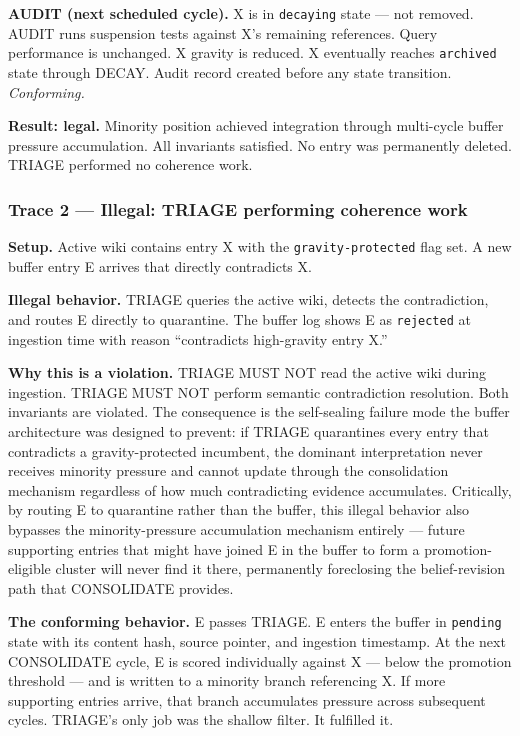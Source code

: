 \documentclass[
  11pt,
]{article}
\begin{document}
\textbf{AUDIT (next scheduled cycle).} X is in \texttt{decaying} state
--- not removed. AUDIT runs suspension tests against X's remaining
references. Query performance is unchanged. X gravity is reduced. X
eventually reaches \texttt{archived} state through DECAY. Audit record
created before any state transition. \emph{Conforming.}

\textbf{Result: legal.} Minority position achieved integration through
multi-cycle buffer pressure accumulation. All invariants satisfied. No
entry was permanently deleted. TRIAGE performed no coherence work.

\hypertarget{trace-2-illegal-triage-performing-coherence-work}{%
\subsubsection{Trace 2 --- Illegal: TRIAGE performing coherence
work}\label{trace-2-illegal-triage-performing-coherence-work}}

\textbf{Setup.} Active wiki contains entry X with the
\texttt{gravity-protected} flag set. A new buffer entry E arrives that
directly contradicts X.

\textbf{Illegal behavior.} TRIAGE queries the active wiki, detects the
contradiction, and routes E directly to quarantine. The buffer log shows
E as \texttt{rejected} at ingestion time with reason ``contradicts
high-gravity entry X.''

\textbf{Why this is a violation.} TRIAGE MUST NOT read the active wiki
during ingestion. TRIAGE MUST NOT perform semantic contradiction
resolution. Both invariants are violated. The consequence is the
self-sealing failure mode the buffer architecture was designed to
prevent: if TRIAGE quarantines every entry that contradicts a
gravity-protected incumbent, the dominant interpretation never receives
minority pressure and cannot update through the consolidation mechanism
regardless of how much contradicting evidence accumulates. Critically,
by routing E to quarantine rather than the buffer, this illegal behavior
also bypasses the minority-pressure accumulation mechanism entirely ---
future supporting entries that might have joined E in the buffer to form
a promotion-eligible cluster will never find it there, permanently
foreclosing the belief-revision path that CONSOLIDATE provides.

\textbf{The conforming behavior.} E passes TRIAGE. E enters the buffer
in \texttt{pending} state with its content hash, source pointer, and
ingestion timestamp. At the next CONSOLIDATE cycle, E is scored
individually against X --- below the promotion threshold --- and is
written to a minority branch referencing X. If more supporting entries
arrive, that branch accumulates pressure across subsequent cycles.
TRIAGE's only job was the shallow filter. It fulfilled it.
\end{document}
